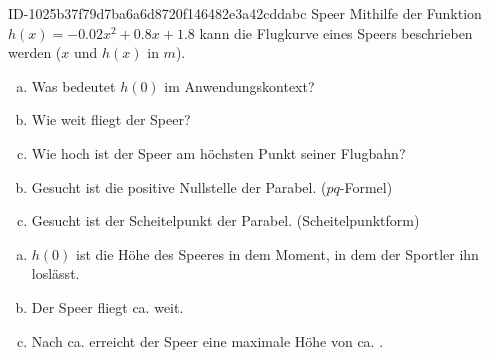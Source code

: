 \begin{exercise}
      {ID-1025b37f79d7ba6a6d8720f146482e3a42cddabc}
      {Speer}
  \ifproblem\problem
    Mithilfe der Funktion $h(x)=-\num{0.02}x^{\num{2}}+\num{0.8}x+\num{1.8}$ kann die Flugkurve
    eines Speers beschrieben werden ($x$ und $h(x)$ in $m$).
    \begin{enumerate}[a)]
      \item Was bedeutet $h(0)$ im Anwendungskontext?
      \item Wie weit fliegt der Speer?
      \item Wie hoch ist der Speer am höchsten Punkt seiner Flugbahn?
    \end{enumerate}
  \fi
  \ifoutline\outline
    \begin{enumerate}[a)]
      \setcounter{enumi}{1}
      \item Gesucht ist die positive Nullstelle der Parabel. ($pq$-Formel)
      \item Gesucht ist der Scheitelpunkt der Parabel. (Scheitelpunktform)
    \end{enumerate}
  \fi
  \ifoutcome\outcome
    \begin{enumerate}[a)]
      \item $h(0)$ ist die Höhe des Speeres in dem Moment, in dem der Sportler ihn loslässt.
      \item Der Speer fliegt ca.  weit.
      \item Nach ca.  erreicht der Speer eine maximale Höhe von ca. .
    \end{enumerate}
  \fi
\end{exercise}
